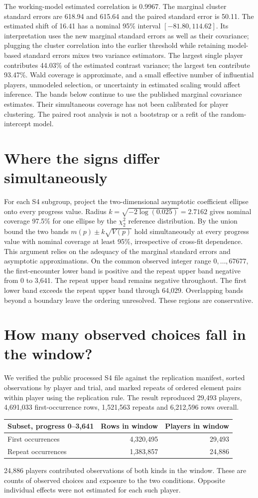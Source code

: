 \documentclass[11pt]{article}
\begin{document}
The working-model estimated correlation is 0.9967. The marginal cluster standard errors are 618.94 and 615.64 and the paired standard error is 50.11. The estimated shift of 16.41 has a nominal 95\% interval $[-81.80,114.62]$. Its interpretation uses the new marginal standard errors as well as their covariance; plugging the cluster correlation into the earlier threshold while retaining model-based standard errors mixes two variance estimators. The largest single player contributes 44.03\% of the estimated contrast variance; the largest ten contribute 93.47\%. Wald coverage is approximate, and a small effective number of influential players, unmodeled selection, or uncertainty in estimated scaling would affect inference. The bands below continue to use the published marginal covariance estimates. Their simultaneous coverage has not been calibrated for player clustering. The paired root analysis is not a bootstrap or a refit of the random-intercept model.
\section{Where the signs differ simultaneously}
For each S4 subgroup, project the two-dimensional asymptotic coefficient ellipse onto every progress value. Radius $k=\sqrt{-2\log(0.025)}=2.7162$ gives nominal coverage 97.5\% for one ellipse by the $\chi^2_2$ reference distribution. By the union bound the two bands $m(p)\pm k\sqrt{V(p)}$ hold simultaneously at every progress value with nominal coverage at least 95\%, irrespective of cross-fit dependence. This argument relies on the adequacy of the marginal standard errors and asymptotic approximations.
\newpage
On the common observed integer range $0,\ldots,67677$, the first-encounter lower band is positive and the repeat upper band negative from 0 to 3,641. The repeat upper band remains negative throughout. The first lower band exceeds the repeat upper band through 64,029. Overlapping bands beyond a boundary leave the ordering unresolved. These regions are conservative.
\section{How many observed choices fall in the window?}
We verified the public processed S4 file against the replication manifest, sorted observations by player and trial, and marked repeats of ordered element pairs within player using the replication rule. The result reproduced 29,493 players, 4,691,033 first-occurrence rows, 1,521,563 repeats and 6,212,596 rows overall.
\begin{center}\begin{tabular}{lrr}\toprule
Subset, progress 0--3,641 & Rows in window & Players in window\\\midrule
First occurrences & 4,320,495 & 29,493\\
Repeat occurrences & 1,383,857 & 24,886\\\bottomrule\end{tabular}\end{center}
24,886 players contributed observations of both kinds in the window. These are counts of observed choices and exposure to the two conditions. Opposite individual effects were not estimated for each such player.
\end{document}
